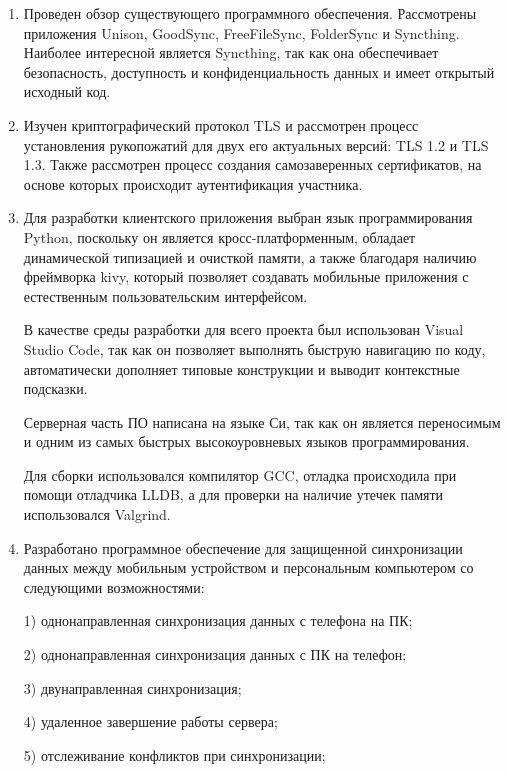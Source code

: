 \begin{enumerate} 
	\item Проведен обзор существующего программного обеспечения.
Рассмотрены приложения Unison, GoodSync, FreeFileSync, FolderSync и Syncthing.
Наиболее интересной является Syncthing, так как она обеспечивает безопасность, доступность и конфиденциальность данных и имеет открытый исходный код.

	\item Изучен криптографический протокол TLS и рассмотрен процесс установления рукопожатий для двух его актуальных версий: TLS 1.2 и TLS 1.3. Также рассмотрен процесс создания самозаверенных сертификатов, на основе которых происходит аутентификация участника.

	\item Для разработки клиентского приложения выбран язык программирования Python, поскольку он является кросс-платформенным, обладает динамической типизацией и очисткой памяти, а также благодаря наличию фреймворка kivy, который позволяет создавать мобильные приложения с естественным пользовательским интерфейсом.

В качестве среды разработки для всего проекта был использован Visual Studio Code, так как он позволяет выполнять быструю навигацию по коду, автоматически дополняет типовые конструкции и выводит контекстные подсказки.

Серверная часть ПО написана на языке Си, так как он является переносимым и одним из самых быстрых высокоуровневых языков программирования.

Для сборки использовался компилятор GCC, отладка происходила при помощи отладчика LLDB, а для проверки на наличие утечек памяти использовался  Valgrind.

	\item Разработано программное обеспечение для защищенной синхронизации данных между мобильным устройством и персональным компьютером со следующими возможностями:

 1) однонаправленная синхронизация данных с телефона на ПК;

 2) однонаправленная синхронизация данных с ПК на телефон;

 3) двунаправленная синхронизация;

 4) удаленное завершение работы сервера;
 
 5) отслеживание конфликтов при синхронизации;

\end{enumerate}